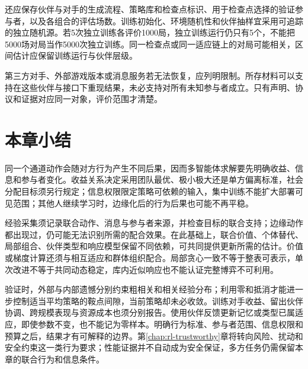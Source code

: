 还应保存伙伴与对手的生成流程、策略库和检查点标识、用于检查点选择的验证参与者，以及各组合的评估场数。训练初始化、环境随机性和伙伴抽样宜采用可追踪的独立随机源。若5次独立训练各评价1000局，独立训练运行仍只有5个，不能把5000场对局当作5000次独立训练。同一检查点或同一适应链上的对局可能相关，区间估计应保留训练运行与伙伴层级。

第三方对手、外部游戏版本或消息服务若无法恢复，应列明限制。所存材料可以支持在这些伙伴与接口下重现结果，未必支持对所有未知参与者成立。只有声明、协议和证据对应同一对象，评价范围才清楚。

\section{本章小结}
\label{sec:rl-multi-agent-summary}

同一个通道动作会随对方行为产生不同后果，因而多智能体求解要先明确收益、信息和参与者变化。收益关系决定采用团队最优、极小极大还是单方偏离标准，社会分配目标须另行规定；信息权限限定策略可依赖的输入，集中训练不能扩大部署可见范围；其他人继续学习时，边缘化后的行为后果也可能不再平稳。

经验采集须记录联合动作、消息与参与者来源，并检查目标的联合支持；边缘动作都出现过，仍可能无法识别所需的配合效果。在此基础上，联合价值、个体替代、局部组合、伙伴类型和响应模型保留不同依赖，可共同提供更新所需的估计。价值或梯度计算还须与相互适应和群体组织配合。局部贪心一致不等于整表可表示，单次改进不等于共同动态稳定，库内近似响应也不能认证完整博弈不可利用。

验证时，外部与内部遗憾分别约束粗相关和相关经验分布；利用零和抵消才能进一步控制适当平均策略的鞍点间隙，当前策略却未必收敛。训练对手收益、留出伙伴协调、跨规模表现与资源成本也须分别报告。使用伙伴反馈更新记忆或类型已属适应，即使参数不变，也不能记为零样本。明确行为标准、参与者范围、信息权限和预算之后，结果才有可解释的边界。第\ref{chap:rl-trustworthy}章将转向风险、扰动和安全约束这一类行为要求；性能证据并不自动成为安全保证，多方任务仍需保留本章的联合行为和信息条件。
